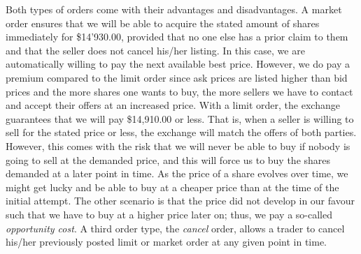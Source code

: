 Both types of orders come with their advantages and disadvantages.
A market order ensures that we will be able to acquire the stated amount of shares immediately for \$14'930.00, provided that no one else  has a prior claim to them and that the seller does not cancel his/her listing.
In this case, we are automatically willing to pay the next available best price.
However, we do pay a premium compared to the limit order since ask prices are listed higher than bid prices and the more shares one wants to buy, the more sellers we have to contact and accept their offers at an increased price.
With a limit order, the exchange guarantees that we will pay \$14,910.00 or less.
That is, when a seller is willing to sell for the stated price or less, the exchange will match the offers of both parties.
However, this comes with the risk that we will never be able to buy if nobody is going to sell at the demanded price, and this will force us to buy the shares demanded at a later point in time.
As the price of a share evolves over time, we might get lucky and be able to buy at a cheaper price than at the time of the initial attempt.
The other scenario is that the price did not develop in our favour such that we have to buy at a higher price later on; thus, we pay a so-called \textit{opportunity cost}.
A third order type, the \textit{cancel} order, allows a trader to cancel his/her previously posted limit or market order at any given point in time.

